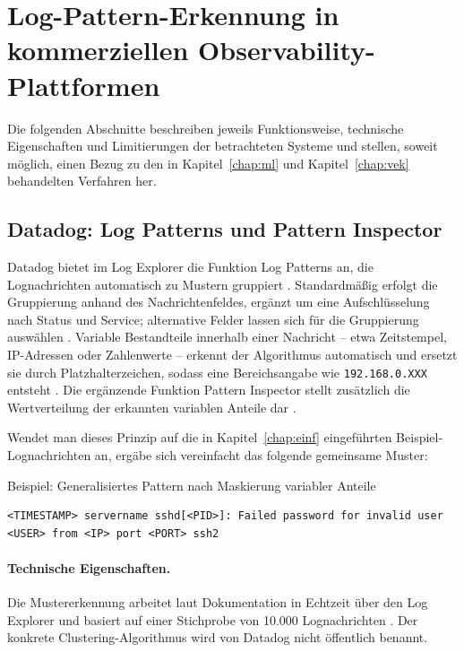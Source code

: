 \section{Log-Pattern-Erkennung in kommerziellen Observability-Plattformen}
\label{sec:kommerziell_marktueberblick}

Die folgenden Abschnitte beschreiben jeweils Funktionsweise, technische Eigenschaften und Limitierungen der betrachteten Systeme und stellen, soweit möglich, einen Bezug zu den in Kapitel~\ref{chap:ml} und Kapitel~\ref{chap:vek} behandelten Verfahren her.

\subsection{Datadog: Log Patterns und Pattern Inspector}
\label{sec:datadog}

Datadog bietet im Log Explorer die Funktion \glqq Log Patterns\grqq{} an, die Lognachrichten automatisch zu Mustern gruppiert \cite{datadogBlogLogPatterns2018}. Standardmäßig erfolgt die Gruppierung anhand des Nachrichtenfeldes, ergänzt um eine Aufschlüsselung nach Status und Service; alternative Felder lassen sich für die Gruppierung auswählen \cite{datadogLogPatternsDocs}. Variable Bestandteile innerhalb einer Nachricht -- etwa Zeitstempel, \ac{IP}-Adressen oder Zahlenwerte -- erkennt der Algorithmus automatisch und ersetzt sie durch Platzhalterzeichen, sodass eine Bereichsangabe wie \texttt{192.168.0.XXX} entsteht \cite{datadogBlogLogPatterns2018}. Die ergänzende Funktion \glqq Pattern Inspector\grqq{} stellt zusätzlich die Wertverteilung der erkannten variablen Anteile dar \cite{datadogBlogPatternInspector2022}.

Wendet man dieses Prinzip auf die in Kapitel~\ref{chap:einf} eingeführten Beispiel-Lognachrichten an, ergäbe sich vereinfacht das folgende gemeinsame Muster:

\begin{logbox}{Beispiel: Generalisiertes Pattern nach Maskierung variabler Anteile}
\begin{lstlisting}
<TIMESTAMP> servername sshd[<PID>]: Failed password for invalid user <USER> from <IP> port <PORT> ssh2
\end{lstlisting}
\end{logbox}

\paragraph{Technische Eigenschaften.}
Die Mustererkennung arbeitet laut Dokumentation in Echtzeit über den Log Explorer und basiert auf einer Stichprobe von 10.000 Lognachrichten \cite{datadogLogPatternsDocs}. %
Der konkrete Clustering-Algorithmus wird von Datadog nicht öffentlich benannt.

